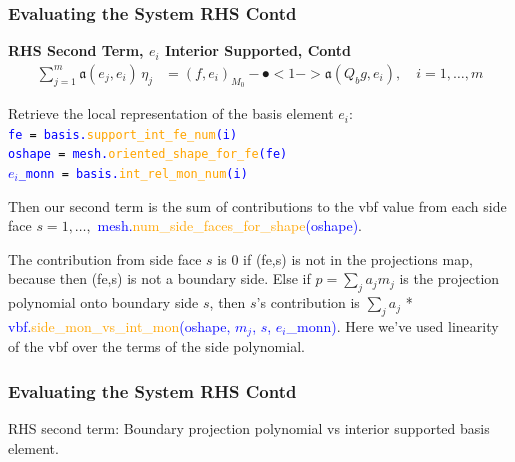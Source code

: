 \documentclass[compress]{beamer}
\begin{document}
\begin{frame}
  \frametitle{Evaluating the System RHS Contd}
  \vspace{-.15cm}
  \textbf{RHS Second Term, $e_i$ Interior Supported, Contd}
  \vspace{-.32cm}
  \begin{align*}
    \sum_{j=1}^m{\mathfrak{a}(e_j, e_i) \,\eta_j} &= (f, e_i)_{M_0} - \spot<1->{\mathfrak{a}(Q_b g, e_i)}, \quad i=1,\dots,m
  \end{align*}
  
  \uncover<+-> {
  Retrieve the local representation of the basis element $e_i$:\\
  \hspace{.2cm} {\small \texttt{\textcolor{blue}{fe \textcolor{black}= basis.\textcolor{orange}{support\_int\_fe\_num}(i)}}}\\
  \hspace{.2cm} {\small \texttt{\textcolor{blue}{oshape \textcolor{black}= mesh.\textcolor{orange}{oriented\_shape\_for\_fe}(fe)}}}\\
  \hspace{.2cm} {\small \texttt{\textcolor{blue}{$e_i$\_monn \textcolor{black}= basis.\textcolor{orange}{int\_rel\_mon\_num}(i)}}}

  \uncover<+-> {
  \vspace{.2cm}
  Then our second term is the sum of contributions to the vbf value from each side face
  $s = 1,\dots, $ \textcolor{blue}{\small mesh.\textcolor{orange}{num\_side\_faces\_for\_shape}(oshape)}.
  
  \uncover<+-> {
  The contribution from side face $s$ is $0$ if (fe,s) is not in the projections map, because then (fe,s) is not
  a boundary side.
  \uncover<+-> {
  Else if $p=\sum_j a_j m_j$ is the projection polynomial onto boundary side $s$, then $s$'s contribution is
  $\sum_j {a_j}$ * \textcolor{blue}{vbf.\textcolor{orange}{side\_mon\_vs\_int\_mon}(oshape, $m_j$, $s$, $e_i$\_monn)}.
  Here we've used linearity of the vbf over the terms of the side polynomial.
  }}}}
\end{frame}


\begin{frame}
  \frametitle{Evaluating the System RHS Contd}
  {\scriptsize RHS second term: Boundary projection polynomial vs interior supported basis element.}
\end{frame}
\end{document}
